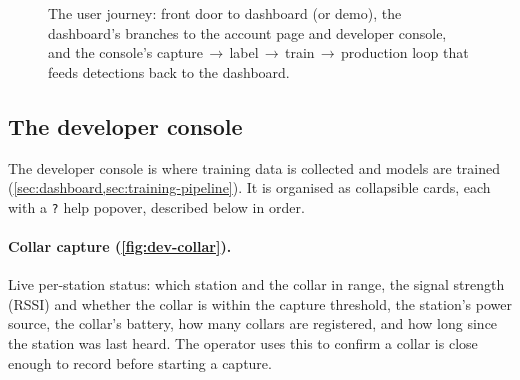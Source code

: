 \begin{figure}[ht]\centering
  \caption{The user journey: front door to dashboard (or demo), the dashboard's branches to the
           account page and developer console, and the console's capture\,$\to$\,label\,$\to$\,train\,$\to$\,production
           loop that feeds detections back to the dashboard.}
  \label{fig:gui-flow}
\end{figure}

\subsection{The developer console}

The developer console is where training data is collected and models are trained
(\cref{sec:dashboard,sec:training-pipeline}). It is organised as collapsible cards, each with a
\texttt{?} help popover, described below in order.

\paragraph{Collar capture (\cref{fig:dev-collar}).} Live per-station status: which station and the
collar in range, the signal strength (RSSI) and whether the collar is within the capture threshold,
the station's power source, the collar's battery, how many collars are registered, and how long since
the station was last heard. The operator uses this to confirm a collar is close enough to record before
starting a capture.

